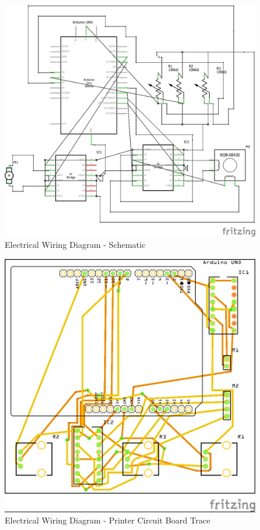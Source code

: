 \documentclass[11pt]{article}
\begin{document}
\begin{figure}[H]
   \centering
   \includegraphics[width=1\textwidth]{img/Electrical_Wiring_Diagram_schematic.png} %
   \caption{Electrical Wiring Diagram - Schematic}
   \label{fig:electricalwiringdiagramschematic}
\end{figure}

\begin{figure}[H]
   \centering
   \includegraphics[width=1\textwidth]{img/Electrical_Wiring_Diagram_pcb.png} %
   \caption{Electrical Wiring Diagram - Printer Circuit Board Trace}
   \label{fig:electricalwiringdiagrampcb}
\end{figure}
\end{document}

